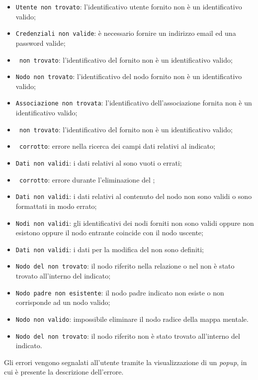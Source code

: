 \begin{itemize}
\item \texttt{Utente non trovato}: l'identificativo utente fornito non è un identificativo valido;
\item \texttt{Credenziali non valide}: è necessario fornire un indirizzo email ed una password valide;
\item \texttt{ non trovato}: l'identificativo del  fornito non è un identificativo valido;
\item \texttt{Nodo non trovato}: l'identificativo del nodo fornito non è un identificativo valido;
\item \texttt{Associazione non trovata}: l'identificativo dell'associazione fornita non è un identificativo valido;
\item \texttt{ non trovato}: l'identificativo del  fornito non è un identificativo valido;
\item \texttt{ corrotto}: errore nella ricerca dei campi dati relativi al  indicato;
\item \texttt{Dati non validi}: i dati relativi al  sono vuoti o errati;
\item \texttt{ corrotto}: errore durante l'eliminazione del ;
\item \texttt{Dati non validi}: i dati relativi al contenuto del nodo non sono validi o sono formattati in modo errato;
\item \texttt{Nodi non validi}: gli identificativi dei nodi forniti non sono validi oppure non esistono oppure il nodo entrante coincide con il nodo uscente;
\item \texttt{Dati non validi}: i dati per la modifica del  non sono definiti;
\item \texttt{Nodo del  non trovato}: il nodo riferito nella relazione o nel  non è stato trovato all'interno del  indicato;
\item \texttt{Nodo padre non esistente}: il nodo padre indicato non esiste o non corrisponde ad un nodo valido;
\item \texttt{Nodo non valido}: impossibile eliminare il nodo radice della mappa mentale.
\item \texttt{Nodo del  non trovato}: il nodo riferito non è stato trovato all'interno del  indicato.
\end{itemize}
Gli errori vengono segnalati all'utente tramite la visualizzazione di un \textit{popup}, in cui è presente la descrizione dell'errore.
